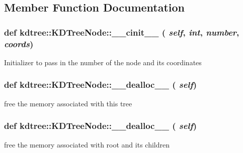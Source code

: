 \subsection{Member Function Documentation}
\hypertarget{classkdtree_1_1KDTreeNode_a5ae0279afcac5bb90b0b7479aa20df57}{
\subsubsection[{\_\-\_\-cinit\_\-\_\-}]{\setlength{\rightskip}{0pt plus 5cm}def kdtree::KDTreeNode::\_\-\_\-cinit\_\-\_\- ( {\em self}, \/   {\em int}, \/   {\em number}, \/   {\em coords})}}
\label{classkdtree_1_1KDTreeNode_a5ae0279afcac5bb90b0b7479aa20df57}
\begin{DoxyVerb}Initializer to pass in the number of the node and its coordinates\end{DoxyVerb}
 \hypertarget{classkdtree_1_1KDTreeNode_addef565cda051889419bf967163b29be}{
\subsubsection[{\_\-\_\-dealloc\_\-\_\-}]{\setlength{\rightskip}{0pt plus 5cm}def kdtree::KDTreeNode::\_\-\_\-dealloc\_\-\_\- ( {\em self})}}
\label{classkdtree_1_1KDTreeNode_addef565cda051889419bf967163b29be}
\begin{DoxyVerb}free the memory associated with this tree\end{DoxyVerb}
 \hypertarget{classkdtree_1_1KDTreeNode_addef565cda051889419bf967163b29be}{
\subsubsection[{\_\-\_\-dealloc\_\-\_\-}]{\setlength{\rightskip}{0pt plus 5cm}def kdtree::KDTreeNode::\_\-\_\-dealloc\_\-\_\- ( {\em self})}}
\label{classkdtree_1_1KDTreeNode_addef565cda051889419bf967163b29be}
\begin{DoxyVerb}free the memory associated with root and its children\end{DoxyVerb}
